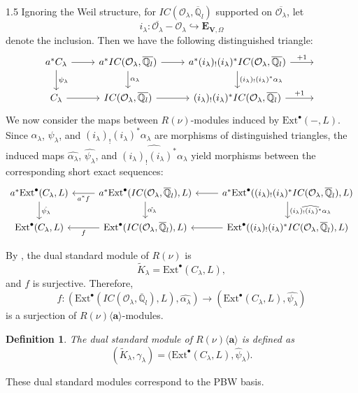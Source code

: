 \documentclass[10pt]{amsart}
\newtheorem{definition}[theorem]{Definition}
\newcommand\mo{{\mathcal{O}}}
\begin{document}
\begin{spacing}{1.5}
Ignoring the Weil structure, for $IC(\mathcal{O}_{\lambda}, \overline{\mathbb{Q}}_l)$ supported on $\overline{\mathcal{O}_{\lambda}}$, let
\[
i_{\lambda} : \overline{\mathcal{O}_{\lambda}} - \mathcal{O}_{\lambda} \hookrightarrow \mathbf{E}_{\mathbf{V},\Omega}
\]
denote the inclusion. Then we have the following distinguished triangle:
\begin{equation}
\begin{tikzcd}
a^*C_{\lambda} \arrow[d, "\psi_{\lambda}"] \arrow[r] & {a^*IC(\mo_{\lambda},\overline{\bbQ_{l}})} \arrow[d, "\alpha_{\lambda}"] \arrow[r] & {a^*(i_{\lambda})_!(i_{\lambda})^*IC(\mo_{\lambda},\overline{\bbQ_{l}})} \arrow[d, "(i_{\lambda})_!(i_{\lambda})^*\alpha_{\lambda}"] \arrow[r, "+1"] & {} \\
C_{\lambda} \arrow[r]                                & {IC(\mo_{\lambda},\overline{\bbQ_{l}})} \arrow[r]                                  & {(i_{\lambda})_!(i_{\lambda})^*IC(\mo_{\lambda},\overline{\bbQ_{l}})} \arrow[r, "+1"]                                                                & {}
\end{tikzcd}
\end{equation}
We now consider the maps between $R(\nu)$-modules induced by $\mathrm{Ext}^{\bullet}(-, L)$. Since $\alpha_{\lambda}$, $\psi_{\lambda}$, and $(i_{\lambda})_! (i_{\lambda})^* \alpha_{\lambda}$ are morphisms of distinguished triangles, the induced maps $\hat{\alpha_{\lambda}}$, $\hat{\psi_{\lambda}}$, and $\widehat{(i_{\lambda})_! (i_{\lambda})^* \alpha_{\lambda}}$ yield morphisms between the corresponding short exact sequences:
\[
\begin{tikzcd}
a^* \mathrm{Ext}^{\bullet}(C_{\lambda}, L) \arrow[d, "\hat{\psi_{\lambda}}"] & 
a^* \mathrm{Ext}^{\bullet}(IC(\mathcal{O}_{\lambda}, \overline{\mathbb{Q}}_l), L) \arrow[d, "\hat{\alpha_{\lambda}}"] \arrow[l, "a^*f"] & 
a^* \mathrm{Ext}^{\bullet}((i_{\lambda})_!(i_{\lambda})^* IC(\mathcal{O}_{\lambda}, \overline{\mathbb{Q}}_l), L) \arrow[d, "\widehat{(i_{\lambda})_!(i_{\lambda})^* \alpha_{\lambda}}"] \arrow[l] \\
\mathrm{Ext}^{\bullet}(C_{\lambda}, L) & 
\mathrm{Ext}^{\bullet}(IC(\mathcal{O}_{\lambda}, \overline{\mathbb{Q}}_l), L) \arrow[l, "f"] & 
\mathrm{Ext}^{\bullet}((i_{\lambda})_!(i_{\lambda})^* IC(\mathcal{O}_{\lambda}, \overline{\mathbb{Q}}_l), L) \arrow[l]
\end{tikzcd}
\]

By \cite[Theorem 2.7]{cd088214-009e-3813-9a86-97f9a299a24c}, the dual standard module of $R(\nu)$ is
\[
\widetilde{K}_{\lambda} = \mathrm{Ext}^{\bullet}(C_{\lambda}, L),
\]
and $f$ is surjective. Therefore,
\[
f : (\mathrm{Ext}^{\bullet}(IC(\mathcal{O}_{\lambda}, \overline{\mathbb{Q}}_l), L), \hat{\alpha_{\lambda}}) \to (\mathrm{Ext}^{\bullet}(C_{\lambda}, L), \hat{\psi_{\lambda}})
\]
is a surjection of $R(\nu)\langle\mathbf{a}\rangle$-modules.
\begin{definition}
   The dual standard module of $R(\nu)\langle\mathbf{a}\rangle$ is defined as 
\[
(\widetilde{K}_{\lambda}, \gamma_{\lambda}) = \bigl(\mathrm{Ext}^{\bullet}(C_{\lambda}, L), \hat{\psi}_{\lambda}\bigr).
\]
\end{definition}
These dual standard modules correspond to the PBW basis.


\end{spacing}
\end{document}
